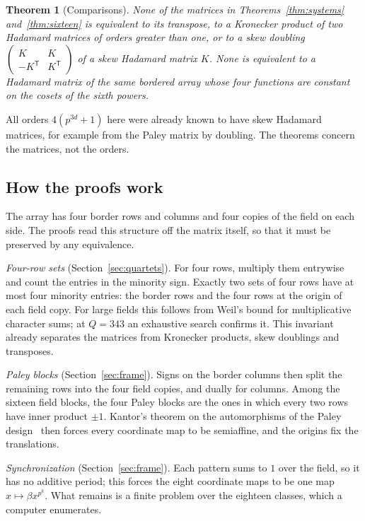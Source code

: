 \documentclass[11pt]{article}
\theoremstyle{plain}
\newtheorem{theorem}{Theorem}[section]
\theoremstyle{definition}
\theoremstyle{remark}
\begin{document}
\begin{theorem}[Comparisons]\label{thm:compare}
None of the matrices in Theorems~\ref{thm:systems} and~\ref{thm:sixteen} is
equivalent to its transpose, to a Kronecker product of two Hadamard matrices
of orders greater than one, or to a skew doubling
$\begin{pmatrix}K&K\\-K^{\mathsf T}&K^{\mathsf T}\end{pmatrix}$ of a skew
Hadamard matrix $K$. None is equivalent to a Hadamard matrix of the same
bordered array whose four functions are constant on the cosets of the
sixth powers.
\end{theorem}

All orders $4(p^{3d}+1)$ here were already known to have skew Hadamard
matrices, for example from the Paley matrix by doubling. The theorems
concern the matrices, not the orders.

\subsection{How the proofs work}
The array has four border rows and columns and four copies of the field on
each side. The proofs read this structure off the matrix itself, so that it
must be preserved by any equivalence.

\emph{Four-row sets} (Section~\ref{sec:quartets}). For four rows, multiply
them entrywise and count the entries in the minority sign. Exactly two sets
of four rows have at most four minority entries: the border rows and the
four rows at the origin of each field copy. For large fields this follows
from Weil's bound for multiplicative character sums; at $Q=343$ an exhaustive
search confirms it. This invariant already separates the matrices from
Kronecker products, skew doublings and transposes.

\emph{Paley blocks} (Section~\ref{sec:frame}). Signs on the border columns
then split the remaining rows into the four field copies, and dually for
columns. Among the sixteen field blocks, the four Paley blocks are the ones
in which every two rows have inner product $\pm1$. Kantor's theorem on the
automorphisms of the Paley design~\cite{Kantor2T} then forces every
coordinate map to be semiaffine, and the origins fix the translations.

\emph{Synchronization} (Section~\ref{sec:frame}). Each pattern sums to $1$
over the field, so it has no additive period; this forces the eight
coordinate maps to be one map $x\mapsto\beta x^{p^k}$. What remains is a
finite problem over the eighteen classes, which a computer enumerates.
\end{document}
